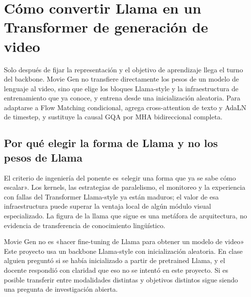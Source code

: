 \section{Cómo convertir Llama en un Transformer de generación de video}

Solo después de fijar la representación y el objetivo de aprendizaje llega el turno del backbone. Movie Gen no transfiere directamente los pesos de un modelo de lenguaje al video, sino que elige los bloques Llama-style y la infraestructura de entrenamiento que ya conoce, y entrena desde una inicialización aleatoria. Para adaptarse a Flow Matching condicional, agrega cross-attention de texto y AdaLN de timestep, y sustituye la causal GQA por MHA bidireccional completa.

\subsection{Por qué elegir la forma de Llama y no los pesos de Llama}

El criterio de ingeniería del ponente es «elegir una forma que ya se sabe cómo escalar». Los kernels, las estrategias de paralelismo, el monitoreo y la experiencia con fallas del Transformer Llama-style ya están maduros; el valor de esa infraestructura puede superar la ventaja local de algún módulo visual especializado. La figura de la llama que sigue es una metáfora de arquitectura, no evidencia de transferencia de conocimiento lingüístico.


\begin{warningbox}{Movie Gen no es «hacer fine-tuning de Llama para obtener un modelo de video»}
Este proyecto usa un backbone Llama-style con inicialización aleatoria. En clase alguien preguntó si se había inicializado a partir de pretrained Llama, y el docente respondió con claridad que eso no se intentó en este proyecto. Si es posible transferir entre modalidades distintas y objetivos distintos sigue siendo una pregunta de investigación abierta.
\end{warningbox}


